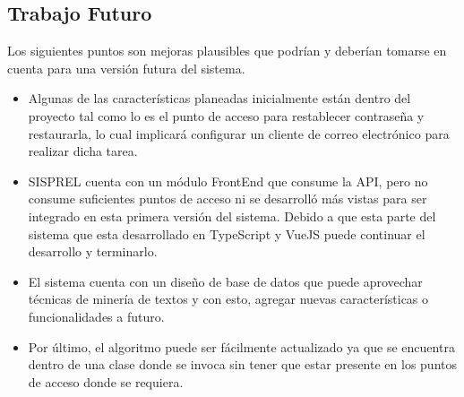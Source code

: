 \subsection{Trabajo Futuro}
Los siguientes puntos son mejoras plausibles que podrían y deberían tomarse en cuenta para una versión futura del sistema.
\begin{itemize}
    \item Algunas de las características planeadas inicialmente están dentro del proyecto tal como lo es el punto de acceso para restablecer contraseña y restaurarla, lo cual implicará configurar un cliente de correo electrónico para realizar dicha tarea.
    \item SISPREL cuenta con un módulo FrontEnd que consume la API, pero no consume suficientes puntos de acceso ni se desarrolló más vistas para ser integrado en esta primera versión del sistema. Debido a que esta parte del sistema que esta desarrollado en TypeScript y VueJS puede continuar el desarrollo y terminarlo. 
    \item El sistema cuenta con un diseño de base de datos que puede aprovechar técnicas de minería de textos y con esto, agregar nuevas características o funcionalidades a futuro.
    \item Por último, el algoritmo puede ser fácilmente actualizado ya que se encuentra dentro de una clase donde se invoca sin tener que estar presente en los puntos de acceso donde se requiera.
\end{itemize}
